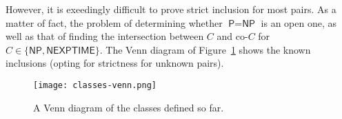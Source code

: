 However, it is exeedingly difficult to prove strict inclusion for most pairs. As a matter of fact, the problem of determining whether \(\textsf{P} = \textsf{NP}\) is an open one, as well as that of finding the intersection between \(C\) and co-\(C\) for \(C\in\{\textsf{NP}, \textsf{NEXPTIME}\}\). The Venn diagram of Figure~\ref{fig:classes-venn} shows the known inclusions (opting for strictness for unknown pairs).


\begin{figure}
    \begin{center}
       \texttt{[image: classes-venn.png]}
    \end{center}
    \caption{A Venn diagram of the classes defined so far.}
    \label{fig:classes-venn}
\end{figure}

